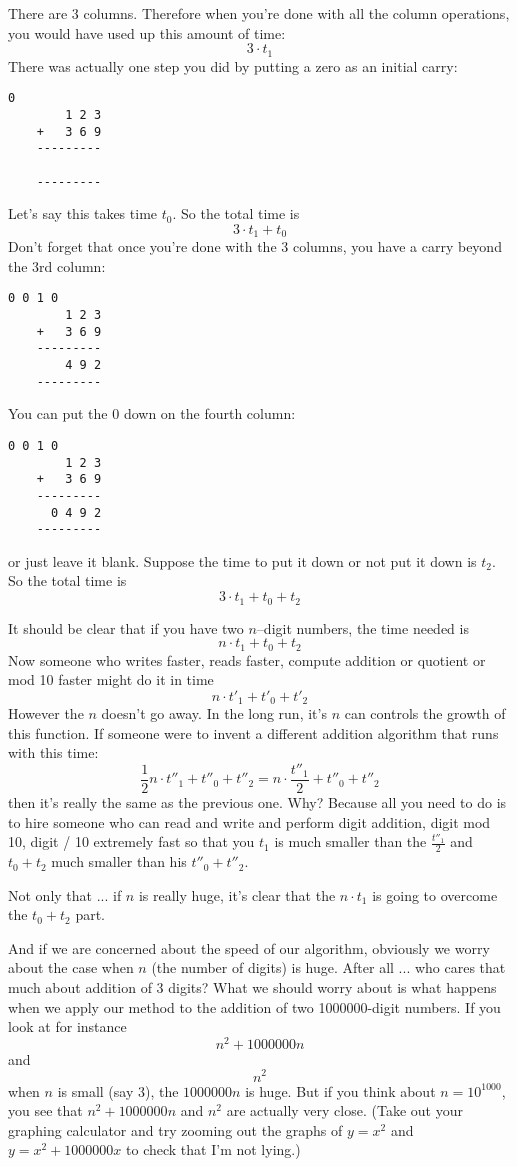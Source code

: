 There are 3 columns. 
Therefore when you're done with all the column operations, you would have
used up this amount of time:
\[
3 \cdot t_1
\]
There was actually one step you did by putting a zero as an initial carry:
\begin{Verbatim}[frame=single]
            0
        1 2 3
    +   3 6 9
    ---------
           
    ---------
\end{Verbatim}
Let's say this takes time $t_0$. 
So the total time is
\[
3 \cdot t_1 + t_0
\]
Don't forget that once you're done with the 3 columns, you have a carry
beyond the 3rd column:
\begin{Verbatim}[frame=single]
      0 0 1 0
        1 2 3
    +   3 6 9
    ---------
        4 9 2 
    ---------
\end{Verbatim}
You can put the 0 down on the fourth column:
\begin{Verbatim}[frame=single]
      0 0 1 0
        1 2 3
    +   3 6 9
    ---------
      0 4 9 2 
    ---------
\end{Verbatim}
or just leave it blank.
Suppose the time to put it down or not put it down is $t_2$.
So the total time is
\[
3 \cdot t_1 + t_0 + t_2
\]

It should be clear that if you have two $n$--digit numbers,
the time needed is
\[
n \cdot t_1 + t_0 + t_2
\]
Now someone who writes faster, reads faster, compute addition or quotient
or mod 10 faster might do it in time
\[
n \cdot t'_1 + t'_0 + t'_2
\]
However the $n$ doesn't go away.
In the long run, it's $n$ can controls the growth of this function.
If someone were to invent a different addition algorithm that runs
with this time:
\[
\frac{1}{2} n \cdot t''_1 + t''_0 + t''_2
= n \cdot \frac{t''_1}{2} + t''_0 + t''_2
\]
then it's really the same as the previous one.
Why?
Because all you need to do is to hire someone who can read and write and
perform digit addition, digit mod 10, digit / 10 extremely fast so that
you $t_1$ is much smaller than the $\frac{t''_1}{2}$
and $t_0 + t_2$ much smaller than his $t''_0 + t''_2$.

Not only that ...
if $n$ is really huge, it's clear that 
the $n \cdot t_1$ is going to overcome the
$t_0 + t_2$ part.

And if we are concerned about the speed of our algorithm,
obviously we worry about the case when $n$ (the number of digits)
is huge.
After all ... who cares that much about addition of 3 digits?
What we should worry about is what happens when
we apply our method to the addition of two 1000000-digit numbers.
If you look at for instance
\[
n^2 + 1000000n
\]
and 
\[
n^2
\]
when $n$ is small (say 3), the $1000000n$ is huge.
But if you think about $n = 10^{1000}$, you see that $n^2 + 1000000n$
and $n^2$ are actually very close.
(Take out your graphing calculator and try zooming out
the graphs of $y = x^2$ and $y = x^2 + 1000000x$ to check
that I'm not lying.)

